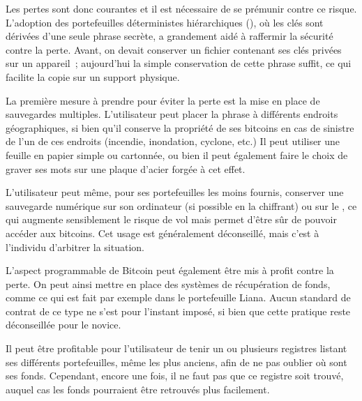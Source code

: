 
Les pertes sont donc courantes et il est nécessaire de se prémunir contre ce risque. L'adoption des portefeuilles déterministes hiérarchiques (), où les clés sont dérivées d'une seule phrase secrète, a grandement aidé à raffermir la sécurité contre la perte. Avant, on devait conserver un fichier contenant ses clés privées sur un appareil~; aujourd'hui la simple conservation de cette phrase suffit, ce qui facilite la copie sur un support physique.

La première mesure à prendre pour éviter la perte est la mise en place de sauvegardes multiples. L'utilisateur peut placer la phrase à différents endroits géographiques, si bien qu'il conserve la propriété de ses bitcoins en cas de sinistre de l'un de ces endroits (incendie, inondation, cyclone, etc.)  Il peut utiliser une feuille en papier simple ou cartonnée, ou bien il peut également faire le choix de graver ses mots sur une plaque d'acier forgée à cet effet.

L'utilisateur peut même, pour ses portefeuilles les moins fournis, conserver une sauvegarde numérique sur son ordinateur (si possible en la chiffrant) ou sur le , ce qui augmente sensiblement le risque de vol mais permet d'être sûr de pouvoir accéder aux bitcoins. Cet usage est généralement déconseillé, mais c'est à l'individu d'arbitrer la situation.

L'aspect programmable de Bitcoin peut également être mis à profit contre la perte. On peut ainsi mettre en place des systèmes de récupération de fonds, comme ce qui est fait par exemple dans le portefeuille Liana. Aucun standard de contrat de ce type ne s'est pour l'instant imposé, si bien que cette pratique reste déconseillée pour le novice. %

Il peut être profitable pour l'utilisateur de tenir un ou plusieurs registres listant ses différents portefeuilles, même les plus anciens, afin de ne pas oublier où sont ses fonds. Cependant, encore une fois, il ne faut pas que ce registre soit trouvé, auquel cas les fonds pourraient être retrouvés plus facilement.

